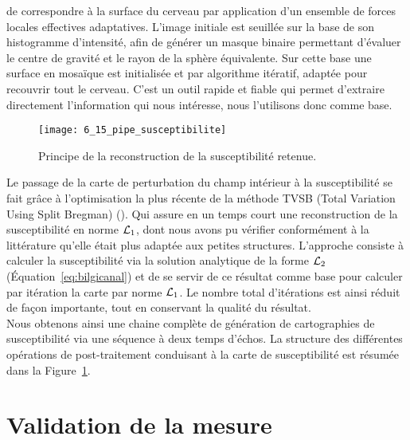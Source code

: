 {de correspondre à la surface du cerveau par application d’un ensemble de forces locales effectives
adaptatives. L’image initiale est seuillée sur la base de son histogramme d’intensité, afin de générer
un masque binaire permettant d’évaluer le centre de gravité et le rayon de la sphère équivalente. Sur
cette base une surface en mosaïque est initialisée et par algorithme itératif, adaptée pour recouvrir
tout le cerveau. C’est un outil rapide et fiable qui permet d’extraire directement l’information qui nous
intéresse, nous l’utilisons donc comme base.\\
\begin{figure}[!t]
\centering
\texttt{[image: 6\_15\_pipe\_susceptibilite]}
\caption{ Principe de la reconstruction de la susceptibilité retenue.}
\label{fig:6_15_pipe_susceptibilite}	
\end{figure}
Le passage de la carte de perturbation du champ intérieur à la susceptibilité se fait grâce à
l’optimisation la plus récente de la méthode TVSB (Total Variation Using Split Bregman) (\cite{Bilgic2014}). Qui assure
en un temps court une reconstruction de la susceptibilité en norme ${\cal L}_1$, dont nous avons pu vérifier
conformément à la littérature qu’elle était plus adaptée aux petites structures. L’approche consiste à
calculer la susceptibilité via la solution analytique de la forme ${\cal L}_2$ (Équation~\ref{eq:bilgicanal}) et de se servir de ce
résultat comme base pour calculer par itération la carte par norme ${\cal L}_1$. Le nombre total d’itérations est
ainsi réduit de façon importante, tout en conservant la qualité du résultat.\\
Nous obtenons ainsi une chaine complète de génération de cartographies de susceptibilité via
une séquence à deux temps d’échos. La structure des différentes opérations de post-traitement
conduisant à la carte de susceptibilité est résumée dans la Figure~\ref{fig:6_15_pipe_susceptibilite}.
\section{Validation de la mesure}
}
